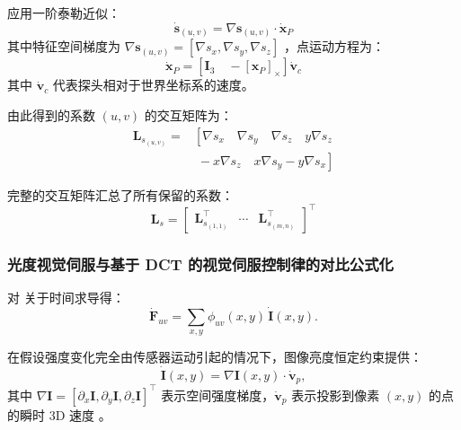 \documentclass{article}
\begin{document}
应用一阶泰勒近似：
\begin{equation}
\dot{\boldsymbol{s}}_{(u,v)} = \nabla \boldsymbol{s}_{(u,v)} \cdot \dot{\boldsymbol{x}}_P
\end{equation}
其中特征空间梯度为 $\nabla \boldsymbol{s}_{(u,v)} = [\nabla s_x, \nabla s_y, \nabla s_z]$ ，点运动方程为：
\begin{equation}
\dot{\boldsymbol{x}}_P = \left[ \boldsymbol{I}_3 \quad -[\boldsymbol{x}_P]_\times \right] \dot{\mathbf{v}}_c
\end{equation}
其中 $\dot{\mathbf{v}}_c$ 代表探头相对于世界坐标系的速度。

由此得到的系数 $(u,v)$ 的交互矩阵为：
\begin{equation} \label{eq:L_s_uv}
	\begin{aligned}
		\boldsymbol{L}_{s_{(u,v)}} = 
		& \left[\nabla s_x \quad \nabla s_y \quad \nabla s_z \quad y\nabla s_z \right. \\
		&\left.\; -x\nabla s_z \quad x\nabla s_y - y\nabla s_x\right]
	\end{aligned}
\end{equation}

完整的交互矩阵汇总了所有保留的系数：
\begin{equation}
\boldsymbol{L}_s = 
\begin{bmatrix}
\boldsymbol{L}_{s_{(1,1)}}^\top & \cdots & \boldsymbol{L}_{s_{(m,n)}}^\top
\end{bmatrix}^\top
\label{L_S}
\end{equation}

\subsubsection{光度视觉伺服与基于 DCT 的视觉伺服控制律的对比公式化}
\label{comparative Formulation}
对  关于时间求导得：
\begin{equation}
\dot{\boldsymbol{F}}_{uv} = \sum_{x,y} \phi_{uv}(x,y) \, \dot{\boldsymbol{I}}(x,y).
\label{eq:dotF}
\end{equation}

在假设强度变化完全由传感器运动引起的情况下，图像亮度恒定约束提供：
\begin{equation}
\dot{\boldsymbol{I}}(x,y) = \nabla \boldsymbol{I}(x,y) \cdot \dot{\mathbf{v}}_p,
\label{eq:dIdt}
\end{equation}
其中 $\nabla \boldsymbol{I} = \left[ \partial_x \boldsymbol{I}, \partial_y \boldsymbol{I}, \partial_z \boldsymbol{I} \right]^\top$ 表示空间强度梯度，$\dot{\mathbf{v}}_p$ 表示投影到像素 $(x,y)$ 的点的瞬时 3D 速度 \cite{chaumette2006visual}。
\end{document}
